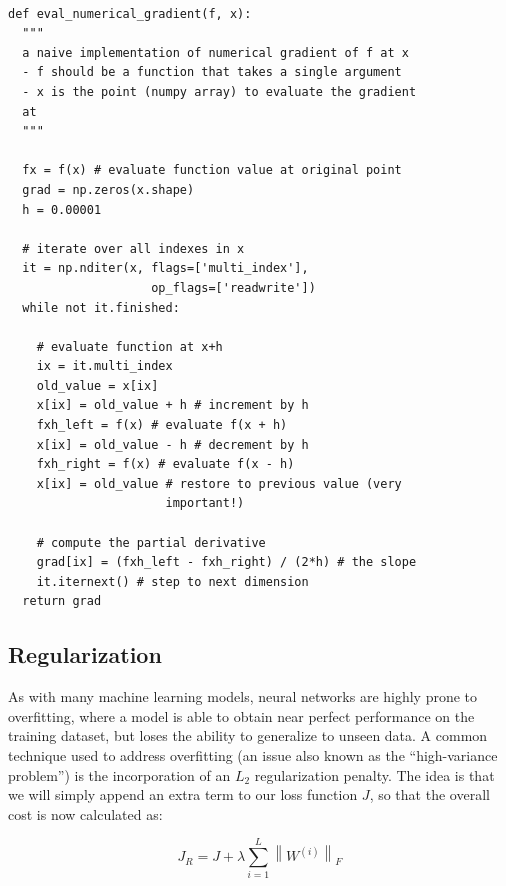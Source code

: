 \documentclass{tufte-handout}
\newcommand{\norm}[1]{\left\lVert#1\right\rVert}
\begin{document}
\begin{theorem}
\begin{verbatim}

def eval_numerical_gradient(f, x):
  """ 
  a naive implementation of numerical gradient of f at x 
  - f should be a function that takes a single argument
  - x is the point (numpy array) to evaluate the gradient 
  at
  """ 

  fx = f(x) # evaluate function value at original point
  grad = np.zeros(x.shape)
  h = 0.00001

  # iterate over all indexes in x
  it = np.nditer(x, flags=['multi_index'], 
  	                op_flags=['readwrite'])
  while not it.finished:

    # evaluate function at x+h
    ix = it.multi_index
    old_value = x[ix]
    x[ix] = old_value + h # increment by h
    fxh_left = f(x) # evaluate f(x + h)
    x[ix] = old_value - h # decrement by h
    fxh_right = f(x) # evaluate f(x - h)
    x[ix] = old_value # restore to previous value (very 
    			      important!)

    # compute the partial derivative
    grad[ix] = (fxh_left - fxh_right) / (2*h) # the slope
    it.iternext() # step to next dimension
  return grad  
\end{verbatim}
\label{snip:gradcheck}
\end{theorem}
\subsection{Regularization}

As with many machine learning models, neural networks are highly prone to overfitting, where a model is able to obtain near perfect performance on the training dataset, but loses the ability to generalize to unseen data. A common technique used to address overfitting (an issue also known as the ``high-variance problem'') is the incorporation of an $L_2$ regularization penalty. The idea is that we will simply append an extra term to our loss function $J$, so that the overall cost is now calculated as:

$$J_R = J + \lambda \sum_{i = 1}^{L} \norm{W^{(i)}}_F$$

\end{document}
